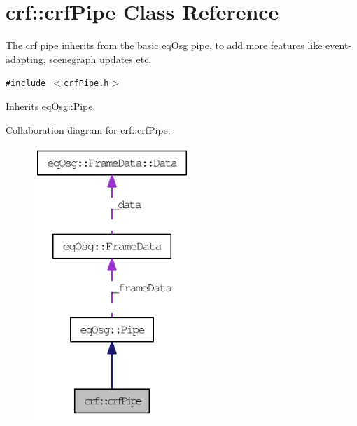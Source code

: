 \hypertarget{a00006}{
\section{crf::crfPipe Class Reference}
\label{a00006}
}
The \hyperlink{a00043}{crf} pipe inherits from the basic \hyperlink{a00045}{eqOsg} pipe, to add more features like event-adapting, scenegraph updates etc.  


{\tt \#include $<$crfPipe.h$>$}

Inherits \hyperlink{a00014}{eqOsg::Pipe}.

Collaboration diagram for crf::crfPipe:\nopagebreak
\begin{figure}[H]
\begin{center}
\leavevmode
\includegraphics[width=168pt]{a00076}
\end{center}
\end{figure}
